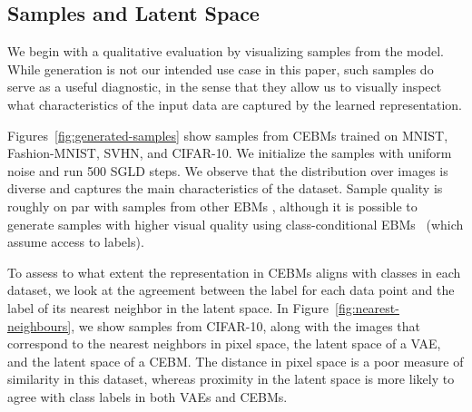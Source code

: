 \documentclass{article}
\begin{document}
\subsection{Samples and Latent Space}
\label{sec:exp:quality}

We begin with a qualitative evaluation by visualizing samples from the model. 
While generation is not our intended use case in this paper, such samples do serve as a useful diagnostic, in the sense that they allow us to visually inspect what characteristics of the input data are captured by the learned representation. 

Figures~\ref{fig:generated-samples} show samples from CEBMs trained on MNIST, Fashion-MNIST, SVHN, and CIFAR-10. We initialize the samples with uniform noise and run 500 SGLD steps. We observe that the distribution over images is diverse and captures the main characteristics of the dataset. Sample quality is roughly on par with samples from other EBMs \cite{nijkamp2019anatomy}, although it is possible to generate samples with higher visual quality using class-conditional EBMs~\cite{du2019implicit, grathwohl2019your, liu2020hybrid} (which assume access to labels).


To assess to what extent the representation in CEBMs aligns with classes in each dataset, we look at the agreement between the label for each data point and the label of its nearest neighbor in the latent space. In Figure~\ref{fig:nearest-neighbours}, we show samples from CIFAR-10, along with the images that correspond to the nearest neighbors in pixel space, the latent space of a VAE, and the latent space of a CEBM. The distance in pixel space is a poor measure of similarity in this dataset, whereas proximity in the latent space is more likely to agree with class labels in both VAEs and CEBMs. 
\end{document}
